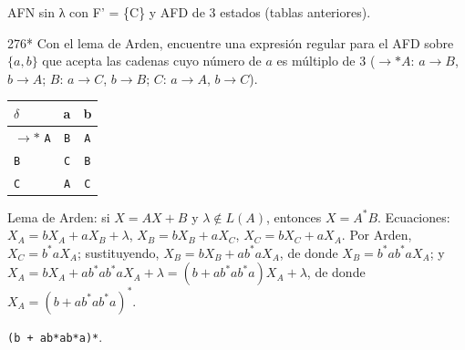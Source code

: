 \documentclass[11pt]{article}
\begin{document}
\resp AFN sin λ con F' = \{C\} y AFD de 3 estados (tablas anteriores).


\begin{ejercicio}{276}{*}
Con el lema de Arden, encuentre una expresión regular para el AFD sobre $\{a, b\}$ que acepta las cadenas cuyo número de $a$ es múltiplo de 3 ($\to *A$: $a \to B$, $b \to A$; $B$: $a \to C$, $b \to B$; $C$: $a \to A$, $b \to C$).
\end{ejercicio}
\proc \begin{center}\small\begin{tabular}{lcc}\toprule
$\delta$ & a & b \\\midrule
$\to$$*$ \texttt{A} & \texttt{B} & \texttt{A} \\
 \texttt{B} & \texttt{C} & \texttt{B} \\
 \texttt{C} & \texttt{A} & \texttt{C} \\
\bottomrule\end{tabular}\end{center}
Lema de Arden: si $X = AX + B$ y $\lambda \notin L(A)$, entonces $X = A^*B$. Ecuaciones: $X_A = bX_A + aX_B + \lambda$, $X_B = bX_B + aX_C$, $X_C = bX_C + aX_A$. Por Arden, $X_C = b^*aX_A$; sustituyendo, $X_B = bX_B + ab^*aX_A$, de donde $X_B = b^*ab^*aX_A$; y $X_A = bX_A + ab^*ab^*aX_A + \lambda = (b + ab^*ab^*a)X_A + \lambda$, de donde $X_A = (b + ab^*ab^*a)^*$.

\resp \texttt{(b + ab*ab*a)*}.
\end{document}
